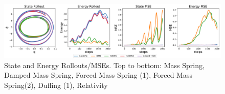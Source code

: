 \documentclass[twoside]{article}
\begin{document}
\begin{figure}[h!]
\includegraphics[width=.9\textwidth]{figures/relativity_1_pred.pdf}
\caption{State and Energy Rollouts/MSEs. Top to bottom: Mass Spring, Damped Mass Spring, Forced Mass Spring (1), Forced Mass Spring(2), Duffing (1), Relativity}
\label{large_fig_rollout}
\end{figure}


\pagebreak


\end{document}
